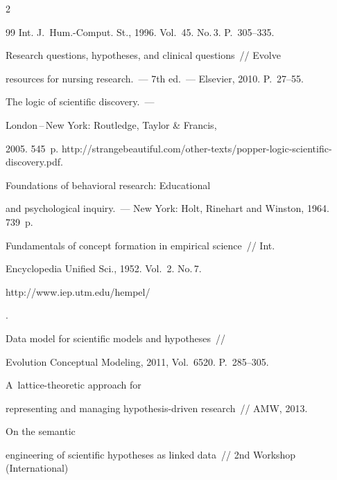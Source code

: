 \begin{multicols}{2}
{{\begin{thebibliography}{99}
Int. J.~Hum.-Comput. St., 1996. Vol.~45. No.\,3. P.~305--335.




 Research questions, hypotheses, and clinical questions~// Evolve


resources for nursing research.~--- 7th ed.~--- Elsevier, 2010. P.~27--55.




 The logic of scientific discovery.~---


London\,--\,New York: Routledge, Taylor \& Francis,


2005. 545~p. {\sf http://strangebeautiful.com/other-texts/popper-logic-scientific-discovery.pdf}.




 Foundations of behavioral research: Educational


and psychological inquiry.~--- New York: Holt, Rinehart and Winston, 1964. 739~p.




 Fundamentals of concept formation in empirical science~// Int.


Encyclopedia Unified Sci., 1952. Vol.~2. No.\,7.


{\sf


http://www.iep.utm.edu/hempel/}.










 Data model for scientific models and hypotheses~//


Evolution Conceptual Modeling, 2011, Vol.~6520. P.~285--305.




 A~lattice-theoretic approach for


representing and managing hypothesis-driven research~// AMW, 2013.







 On the semantic


engineering of scientific hypotheses as linked data~// 2nd Workshop (International)



\end{thebibliography}}}
\end{multicols}
